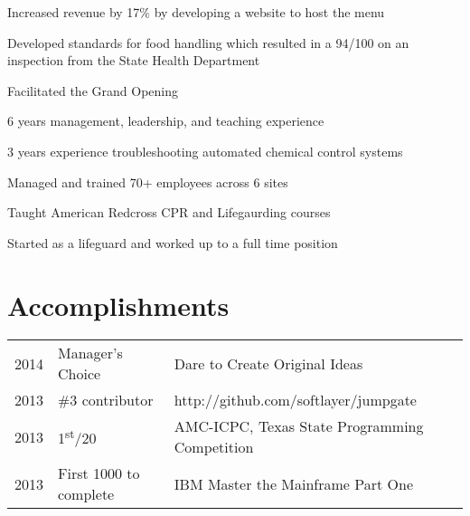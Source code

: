 \documentclass[letterpaper]{resume} %
\begin{document}
\begin{minipage}[t]{0.66\textwidth}
\sectionspace %


\begin{tightitemize}
\item Increased revenue by 17\% by developing a website to host the menu
\item Developed standards for food handling which resulted in a 94/100 on an inspection from the State Health Department
\item Facilitated the Grand Opening
\end{tightitemize}

\sectionspace %

\begin{tightitemize}
\item 6 years management, leadership, and teaching experience
\item 3 years experience troubleshooting automated chemical control systems
\item Managed and trained 70+ employees across 6 sites
\item Taught American Redcross CPR and Lifegaurding courses
\item Started as a lifeguard and worked up to a full time position
\end{tightitemize}

\sectionspace %



\section{Accomplishments} 

\begin{tabular}{rll}
2014	 & Manager's Choice & Dare to Create Original Ideas\\
2013  & \#3 contributor & http://github.com/softlayer/jumpgate \\
2013	 & 1\textsuperscript{st}/20 & AMC-ICPC, Texas State Programming Competition\\
2013	 & First 1000 to complete & IBM Master the Mainframe Part One\\
\end{tabular}


\end{minipage}
\end{document}
